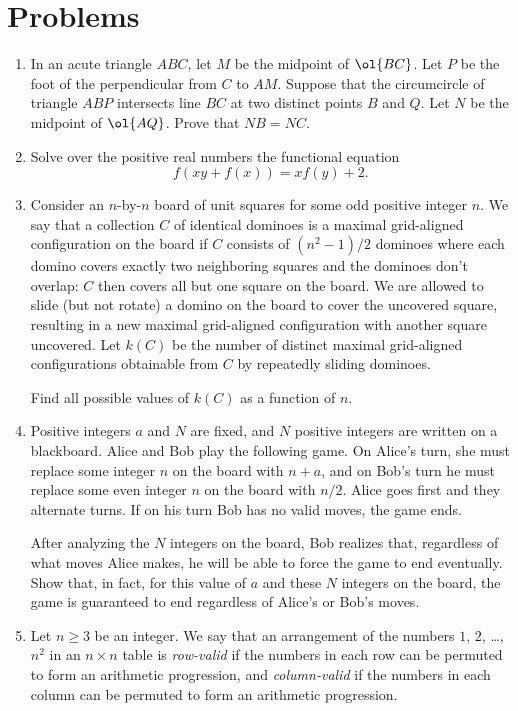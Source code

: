 \documentclass[11pt]{scrartcl}
\begin{document}
\section{Problems}
\begin{enumerate}[\bfseries 1.]
\item %
In an acute triangle $ABC$, let $M$ be the midpoint of $\ol{BC}$.
Let $P$ be the foot of the perpendicular from $C$ to $AM$.
Suppose that the circumcircle of triangle $ABP$
intersects line $BC$ at two distinct points $B$ and $Q$.
Let $N$ be the midpoint of $\ol{AQ}$.
Prove that $NB = NC$.

\item %
Solve over the positive real numbers the functional equation
\[ f(xy+f(x)) = xf(y) + 2. \]

\item %
Consider an $n$-by-$n$ board of unit squares for some odd positive integer $n$.
We say that a collection $C$ of identical dominoes is a
maximal grid-aligned configuration on the board if $C$ consists of $(n^2-1)/2$
dominoes where each domino covers exactly two neighboring squares
and the dominoes don't overlap: $C$ then covers all but one square on the board.
We are allowed to slide (but not rotate) a domino on the board to
cover the uncovered square, resulting in a new maximal grid-aligned configuration
with another square uncovered. Let $k(C)$ be the number of distinct maximal
grid-aligned configurations obtainable from $C$ by repeatedly sliding dominoes.

Find all possible values of $k(C)$ as a function of $n$.

\item %
Positive integers $a$ and $N$ are fixed,
and $N$ positive integers are written on a blackboard.
Alice and Bob play the following game.
On Alice's turn, she must replace some integer $n$ on the board with $n+a$,
and on Bob's turn he must replace some even integer $n$ on the board with $n/2$.
Alice goes first and they alternate turns.
If on his turn Bob has no valid moves, the game ends.

After analyzing the $N$ integers on the board, Bob realizes that,
regardless of what moves Alice makes,
he will be able to force the game to end eventually.
Show that, in fact, for this value of $a$ and these $N$ integers on the board,
the game is guaranteed to end regardless of Alice's or Bob's moves.

\item %
Let $n\geq3$ be an integer. We say that an arrangement of the numbers
$1$, $2$, \dots, $n^2$ in an $n \times n$ table is \emph{row-valid}
if the numbers in each row can be permuted to form an arithmetic progression,
and \emph{column-valid} if the numbers in each column
can be permuted to form an arithmetic progression.


\end{enumerate}
\end{document}
